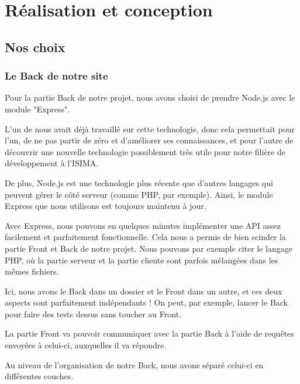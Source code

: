 \documentclass[12pt,french]{article}
\begin{document}
\section{Réalisation et conception}

\subsection{Nos choix}

\subsubsection{Le Back de notre site}

Pour la partie \gls{Back} de notre projet, nous avons choisi de prendre Node.js avec le module "Express".

\medskip

L'un de nous avait déjà travaillé sur cette technologie, donc cela permettait pour l'un, de ne pas partir de zéro et d'améliorer ses connaissances, et pour l'autre de découvrir une nouvelle technologie possiblement très utile pour notre filière de développement à l'ISIMA.

\medskip

De plus, Node.js est une technologie plus récente que d'autres langages qui peuvent gérer le côté serveur (comme PHP, par exemple). Ainsi, le module Express que nous utilisons est toujours maintenu à jour.

\medskip

Avec Express, nous pouvons en quelques minutes implémenter une \gls{API} assez facilement et parfaitement fonctionnelle. Cela nous a permis de bien scinder la partie \gls{Front} et \gls{Back} de notre projet.
Nous pouvons par exemple citer le langage PHP, où la partie serveur et la partie cliente sont parfois mélangées dans les mêmes fichiers.

Ici, nous avons le \gls{Back} dans un dossier et le \gls{Front} dans un autre, et ces deux aspects sont parfaitement indépendants ! On peut, par exemple, lancer le \gls{Back} pour faire des tests dessus sans toucher au \gls{Front}.

La partie \gls{Front} va pouvoir communiquer avec la partie \gls{Back} à l'aide de requêtes envoyées à celui-ci, auxquelles il va répondre.

\bigskip

Au niveau de l'organisation de notre \gls{Back}, nous avons séparé celui-ci en différentes couches.

\medskip
\end{document}

